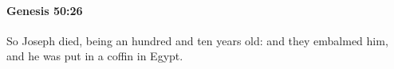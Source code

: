 		\paragraph{Genesis 50:26} %
			\label{GENESIS-50-26}

			So Joseph died, being an hundred and ten years old: and they embalmed him, and he was put in a coffin in Egypt.

